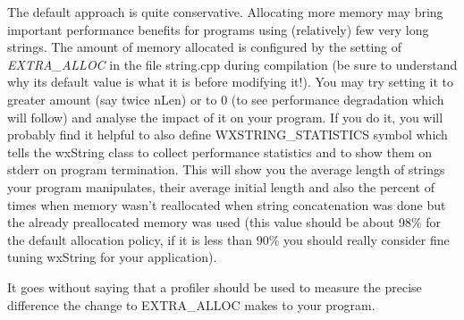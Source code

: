 The default approach is quite conservative. Allocating more memory may bring
important performance benefits for programs using (relatively) few very long
strings. The amount of memory allocated is configured by the setting of {\it
EXTRA\_ALLOC} in the file string.cpp during compilation (be sure to understand
why its default value is what it is before modifying it!). You may try setting
it to greater amount (say twice nLen) or to 0 (to see performance degradation
which will follow) and analyse the impact of it on your program. If you do it,
you will probably find it helpful to also define WXSTRING\_STATISTICS symbol
which tells the wxString class to collect performance statistics and to show
them on stderr on program termination. This will show you the average length of
strings your program manipulates, their average initial length and also the
percent of times when memory wasn't reallocated when string concatenation was
done but the already preallocated memory was used (this value should be about
98\% for the default allocation policy, if it is less than 90\% you should
really consider fine tuning wxString for your application).

It goes without saying that a profiler should be used to measure the precise
difference the change to EXTRA\_ALLOC makes to your program.

